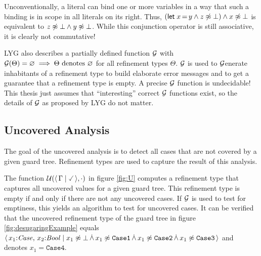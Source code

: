 Unconventionally, a literal can bind one or more variables in a way that such a binding is in scope in all literals on its right.
Thus, $(\textsf{let}\;x\,\textsf{=}\,y \land z \not\approx \bot) \land x \not\approx \bot$ is equivalent to $z \not\approx \bot \land y \not\approx \bot$.
While this conjunction operator is still associative, it is clearly not commutative!

LYG also describes a partially defined function $\mathcal{G}$
with $\mathcal{G}(\Theta) = \varnothing \implies \Theta \text{ denotes } \varnothing$ for all refinement types $\Theta$.
$\mathcal{G}$ is used to $\mathcal{G}$enerate inhabitants of a refinement type to build elaborate error messages
and to get a guarantee that a refinement type is empty.
A precise $\mathcal{G}$ function is undecidable!
This thesis just assumes that ``interesting'' correct $\mathcal{G}$ functions exist,
so the details of $\mathcal{G}$ as proposed by LYG do not matter.

\subsection{Uncovered Analysis}

The goal of the uncovered analysis is to detect all cases that are not covered by a given guard tree.
Refinement types are used to capture the result of this analysis.

The function $\unc(\reft{\Gamma}{\true}, \cdot)$ in figure \ref{fig:U}
computes a refinement type that captures all uncovered values for a given guard tree.
This refinement type is empty if and only if there are not any uncovered cases.
If $\mathcal{G}$ is used to test for emptiness, this yields an algorithm to test for uncovered cases.
It can be verified that the uncovered refinement type of the guard tree in
figure \ref{fig:desugaringExample} equals $\langle \,  x_1{:}\mathit{Case}, \, x_2{:}\mathit{Bool} \mid  x_1 \not\approx \bot \,\dot{\wedge}\, x_1 \not\approx \mathtt{Case1} \,\dot{\wedge}\, x_1 \not\approx \mathtt{Case2} \,\dot{\wedge}\, x_1 \not\approx \mathtt{Case3}  \, \rangle$ and denotes $x_1 = \mathtt{Case4}$.

